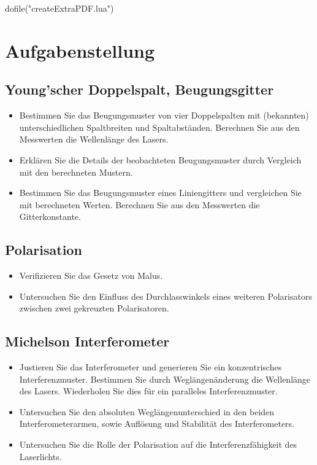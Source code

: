 \documentclass[12pt,english,ngerman]{scrartcl}
\begin{document}
\begin{luacode*}
dofile("createExtraPDF.lua")
\end{luacode*}

%
\tableofcontents

\newpage

\section{Aufgabenstellung}\label{Auf}

\subsection{Young'scher Doppelspalt, Beugungsgitter}

\begin{itemize}
	\item Bestimmen Sie das Beugungsmuster von vier Doppelspalten mit (bekannten)
	      unterschiedlichen Spaltbreiten und Spaltabständen. Berechnen Sie aus den
	      Messwerten die Wellenlänge des Lasers.
	\item Erklären Sie die Details der beobachteten Beugungsmuster durch Vergleich mit
	      den berechneten Mustern.
	\item Bestimmen Sie das Beugungsmuster eines Liniengitters und vergleichen Sie mit
	      berechneten Werten. Berechnen Sie aus den Messwerten die Gitterkonstante.
\end{itemize}

\subsection{Polarisation}

\begin{itemize}
	\item Verifizieren Sie das Gesetz von Malus.
	\item Untersuchen Sie den Einfluss des Durchlasswinkels eines weiteren Polarisators
	      zwischen zwei gekreuzten Polarisatoren.
\end{itemize}

\subsection{Michelson Interferometer}

\begin{itemize}
	\item Justieren Sie das Interferometer und generieren Sie ein konzentrisches
	      Interferenzmuster. Bestimmen Sie durch Weglängenänderung die Wellenlänge des
	      Lasers. Wiederholen Sie dies für ein paralleles Interferenzmuster.
	\item Untersuchen Sie den absoluten Weglängenunterschied in den beiden
	      Interferometerarmen, sowie Auflösung und Stabilität des Interferometers.
	\item Untersuchen Sie die Rolle der Polarisation auf die Interferenzfähigkeit des
	      Laserlichts.
\end{itemize}
\end{document}
